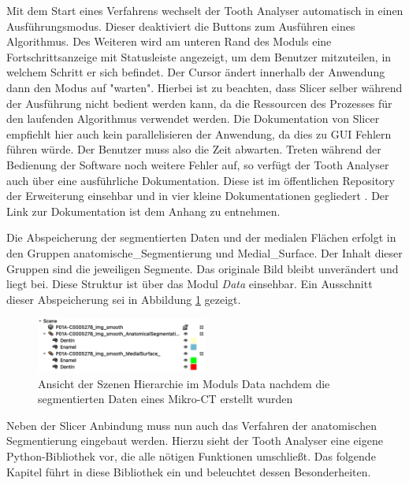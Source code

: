 Mit dem Start eines Verfahrens wechselt der Tooth Analyser automatisch in einen
Ausführungsmodus. Dieser deaktiviert die Buttons zum Ausführen eines Algorithmus.
Des Weiteren wird am unteren Rand des Moduls eine Fortschrittsanzeige mit
Statusleiste angezeigt, um dem Benutzer mitzuteilen, in welchem Schritt er sich
befindet. Der Cursor ändert innerhalb der Anwendung dann den Modus auf "warten".
Hierbei ist zu beachten, dass Slicer selber während der Ausführung nicht bedient
werden kann, da die Ressourcen des Prozesses für den laufenden Algorithmus
verwendet werden. Die Dokumentation von Slicer empfiehlt hier auch kein parallelisieren
der Anwendung, da dies zu \ac{GUI} Fehlern führen würde. Der Benutzer muss also
die Zeit abwarten. Treten während der Bedienung der Software noch weitere Fehler
auf, so verfügt der Tooth Analyser auch über eine ausführliche Dokumentation. Diese
ist im öffentlichen Repository der Erweiterung einsehbar und in vier kleine Dokumentationen
gegliedert \citep[vgl.][]{procida2017}. Der Link zur Dokumentation ist dem Anhang
zu entnehmen.

Die Abspeicherung der segmentierten Daten und der medialen Flächen erfolgt in den
Gruppen anatomische\_Segmentierung und Medial\_Surface. Der Inhalt dieser
Gruppen sind die jeweiligen Segmente. Das originale Bild bleibt unverändert und liegt
bei. Diese Struktur ist über das Modul \textit{Data} einsehbar. Ein Ausschnitt
dieser Abspeicherung sei in Abbildung \ref{fig:data_module} gezeigt.

\pagebreak

\begin{figure}[h]
	\centering
	\includegraphics[width=0.5\textwidth]{img/data_module.png}
	\caption{Ansicht der Szenen Hierarchie im Moduls Data nachdem die
	segmentierten Daten eines Mikro-CT erstellt wurden}
	\label{fig:data_module}
\end{figure}

Neben der Slicer Anbindung muss nun auch das Verfahren der anatomischen
Segmentierung eingebaut werden. Hierzu sieht der Tooth Analyser eine eigene Python-Bibliothek
vor, die alle nötigen Funktionen umschließt. Das folgende Kapitel führt in diese
Bibliothek ein und beleuchtet dessen Besonderheiten.

